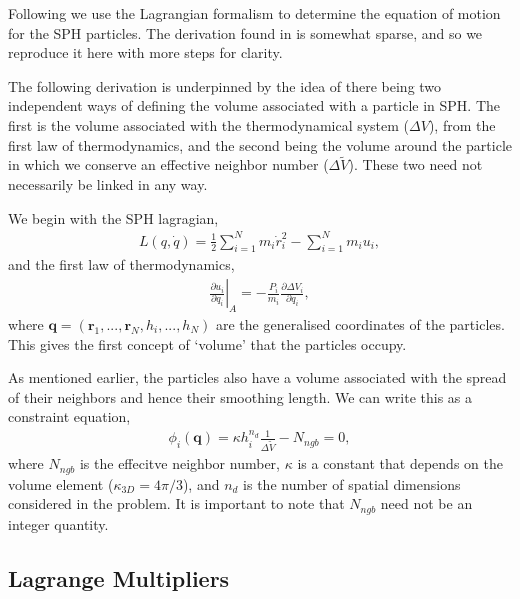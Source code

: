 Following \citet{hopkins2013} we use the Lagrangian formalism to determine the
equation of motion for the SPH particles. The derivation found in
\citet{hopkins2013} is somewhat sparse, and so we reproduce it here with more
steps for clarity.

The following derivation is underpinned by the idea of there being two
independent ways of defining the volume associated with a particle in SPH. The
first is the volume associated with the thermodynamical system ($\Delta V$),
from the first law of thermodynamics, and the second being the volume around the
particle in which we conserve an effective neighbor number ($\Delta \tilde{V}$).
These two need not necessarily be linked in any way.

We begin with the SPH lagragian,
\begin{align}
  L(q, \dot{q}) = \frac{1}{2}\sum^N_{i=1} m_i \dot{r}^2_i
    - \sum^N_{i=1} m_i u_i,
  \label{eqn:sph:derivation:sphlagrangian}
\end{align}
and the first law of thermodynamics,
\begin{align}
  \left. \frac{\partial u_i}{\partial q_i} \right|_A =
  -\frac{P_i}{m_i} \frac{\partial \Delta V_i}{\partial q_i},
  \label{eqn:sph:derivation:firstlaw}
\end{align}
where $\mathbf{q} = (\mathbf{r}_1, ..., \mathbf{r}_N, h_i, ..., h_N)$ are the
generalised coordinates of the particles. This gives the first concept of
`volume' that the particles occupy.

As mentioned earlier, the particles also have a volume associated with the
spread of their neighbors and hence their smoothing length. We can write this as
a constraint equation,
\begin{align}
    \phi_i(\mathbf{q}) = \kappa h_i^{n_d}
      \frac{1}{\Delta \tilde{V}} - N_{ngb} = 0,
  \label{eqn:sph:derivation:constraint}
\end{align}
where $N_{ngb}$ is the effecitve neighbor number, $\kappa$ is a constant that
depends on the volume element ($\kappa_{3D} = 4\pi/3$), and $n_d$ is the number
of spatial dimensions considered in the problem. It is important to note that
$N_{ngb}$ need not be an integer quantity.

\subsection{Lagrange Multipliers}

